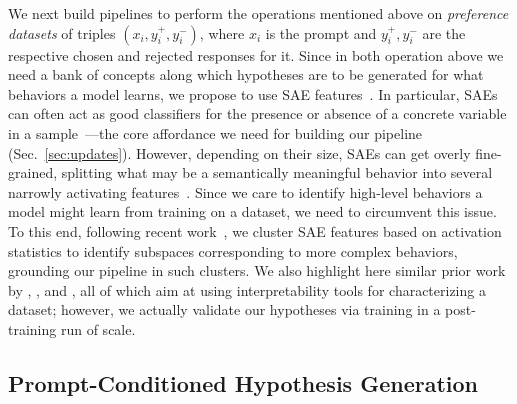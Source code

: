 \documentclass{article} %
\begin{document}
We next build pipelines to perform the operations mentioned above on \textit{preference datasets} of triples $(x_i,y_i^+,y_i^-)$, where $x_i$ is the prompt and $y_i^+,y_i^-$ are the respective chosen and rejected responses for it. 
% 
Since in both operation above we need a bank of concepts along which hypotheses are to be generated for what behaviors a model learns, we propose to use SAE features~\citep{cunningham2023sparse, fel2025archetypal, bricken2023monosemanticity, gao2024scaling, bussmann2024batchtopk, hindupur2025projecting, costa2025flat}. 
% 
In particular, SAEs can often act as good classifiers for the presence or absence of a concrete variable in a sample~\citep{karvonen2025saebench, fel2025archetypal, nguyen2025deploying, bricker2024saes}---the core affordance we need for building our pipeline (Sec.~\ref{sec:updates}).
% 
However, depending on their size, SAEs can get overly fine-grained, splitting what may be a semantically meaningful behavior into several narrowly activating features~\citep{chanin2025absorptionstudyingfeaturesplitting, bricken2023monosemanticity}. 
% 
Since we care to identify high-level behaviors a model might learn from training on a dataset, we need to circumvent this issue. 
% 
To this end, following recent work~\citep{bhalla2026sparse}, we cluster SAE features based on activation statistics to identify subspaces corresponding to more complex behaviors, grounding our pipeline in such clusters.
% 
We also highlight here similar prior work by \cite{movva2025s}, \cite{bohacek2025uncovering}, and \cite{jiang2025interpretable}, all of which aim at using interpretability tools for characterizing a dataset; however, we actually validate our hypotheses via training in a post-training run of scale.














\subsection{Prompt-Conditioned Hypothesis Generation}
\label{sec:local-hypothesis-generation}
\end{document}
